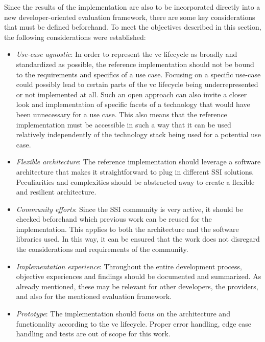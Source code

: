     Since the results of the implementation are also to be incorporated directly into a new developer-oriented evaluation framework, there are some key considerations that must be defined beforehand. To meet the objectives described in this section, the following considerations were established:
    \begin{itemize}
        \item \textit{Use-case agnostic}: In order to represent the \ac{vc} lifecycle as broadly and standardized as possible, the reference implementation should not be bound to the requirements and specifics of a use case. Focusing on a specific use-case could possibly lead to certain parts of the \ac{vc} lifecycle being underrepresented or not implemented at all. Such an open approach can also invite a closer look and implementation of specific facets of a technology that would have been unnecessary for a use case. This also means that the reference implementation must be accessible in such a way that it can be used relatively independently of the technology stack being used for a potential use case.
        \item \textit{Flexible architecture}: The reference implementation should leverage a software architecture that makes it straightforward to plug in different \ac{SSI} solutions. Peculiarities and complexities should be abstracted away to create a flexible and resilient architecture. 
        \item \textit{Community efforts}: Since the \ac{SSI} community is very active, it should be checked beforehand which previous work can be reused for the implementation. This applies to both the architecture and the software libraries used. In this way, it can be ensured that the work does not disregard the considerations and requirements of the community.
        \item \textit{Implementation experience}: Throughout the entire development process, objective experiences and findings should be documented and summarized. As already mentioned, these may be relevant for other developers, the providers, and also for the mentioned evaluation framework.
        \item \textit{Prototype}: The implementation should focus on the architecture and functionality according to the \ac{vc} lifecycle. Proper error handling, edge case handling and tests are out of scope for this work.
    \end{itemize}
    
